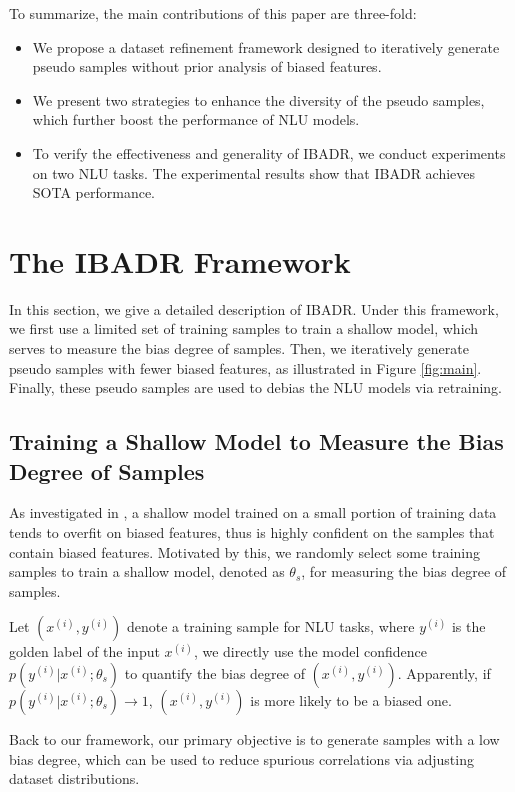 \documentclass[11pt]{article}
\def\model{\textsc{IBADR}\xspace}
\begin{document}
To summarize, the main contributions of this paper are three-fold: 
\begin{itemize}
    \item  We propose a dataset refinement framework designed to iteratively generate pseudo samples without prior analysis of biased features.
    \item We present two strategies to enhance the diversity of the pseudo samples, which further boost the performance of NLU models.
    \item To verify the effectiveness and generality of \model, we conduct experiments on two NLU tasks. The experimental results show that \model achieves SOTA performance.
\end{itemize}

\section{The \model Framework}
In this section, we give a detailed description of \model.
Under this framework, we first use a limited set of training samples to train a shallow model, which serves to measure the bias degree of samples. Then, we iteratively generate pseudo samples with fewer biased features, as illustrated in Figure \ref{fig:main}. Finally, these pseudo samples are used to debias the NLU models via retraining.



\subsection{Training a Shallow Model to Measure the Bias Degree of Samples}
\label{sec:measure}
As investigated in \cite{DBLP:conf/emnlp/UtamaMG20}, a shallow model trained on a small portion of training data tends to overfit on biased features, thus is highly confident on the samples that contain biased features. Motivated by this, we randomly select some training samples to train a shallow model, denoted as $\theta_s$, for measuring the bias degree of samples.

Let $(x^{(i)}, y^{(i)})$ denote a training sample for NLU tasks, where $y^{(i)}$ is the golden label of the input $x^{(i)}$, we directly use the model confidence $p(y^{(i)}|x^{(i)};\theta_s)$ to quantify the bias degree of $(x^{(i)}, y^{(i)})$. Apparently, if $p(y^{(i)}|x^{(i)};\theta_s) \xrightarrow{} 1$, $(x^{(i)}, y^{(i)})$ is more likely to be a biased one.

Back to our framework, our primary objective is to generate samples with a low bias degree, which can be used to reduce spurious correlations via adjusting dataset distributions.
\end{document}
